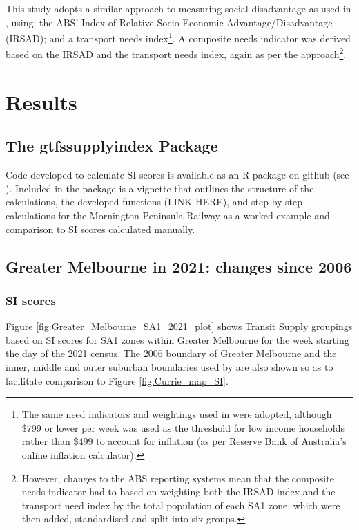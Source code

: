 \documentclass[preprint, 3p,
authoryear]{elsarticle} %
\begin{document}
This study adopts a similar approach to measuring social disadvantage as
used in \citet{currie2010identifying}, using: the ABS' Index of Relative
Socio-Economic Advantage/Disadvantage (IRSAD); and a transport needs
index\footnote{The same need indicators and weightings used in
  \citet{currie2010identifying} were adopted, although \$799 or lower
  per week was used as the threshold for low income households rather
  than \$499 to account for inflation (as per Reserve Bank of
  Australia's online inflation calculator).}. A composite needs
indicator was derived based on the IRSAD and the transport needs index,
again as per the \citet{currie2010identifying} approach\footnote{However,
  changes to the ABS reporting systems mean that the composite needs
  indicator had to based on weighting both the IRSAD index and the
  transport need index by the total population of each SA1 zone, which
  were then added, standardised and split into six groups.}.

\section{Results}\label{results}

\subsection{The gtfssupplyindex
Package}\label{the-gtfssupplyindex-package}

Code developed to calculate SI scores is available as an R package on
github (see \citet{gtfssupplyindex_github}). Included in the package is
a vignette that outlines the structure of the calculations, the
developed functions (LINK HERE), and step-by-step calculations for the
Mornington Peninsula Railway as a worked example and comparison to SI
scores calculated manually.

\subsection{Greater Melbourne in 2021: changes since
2006}\label{greater-melbourne-in-2021-changes-since-2006}

\subsubsection{SI scores}\label{si-scores}

Figure \ref{fig:Greater_Melbourne_SA1_2021_plot} shows Transit Supply
groupings based on SI scores for SA1 zones within Greater Melbourne for
the week starting the day of the 2021 census. The 2006 boundary of
Greater Melbourne and the inner, middle and outer suburban boundaries
used by \citet{currie2010identifying} are also shown so as to facilitate
comparison to Figure \ref{fig:Currie_map_SI}.
\end{document}
